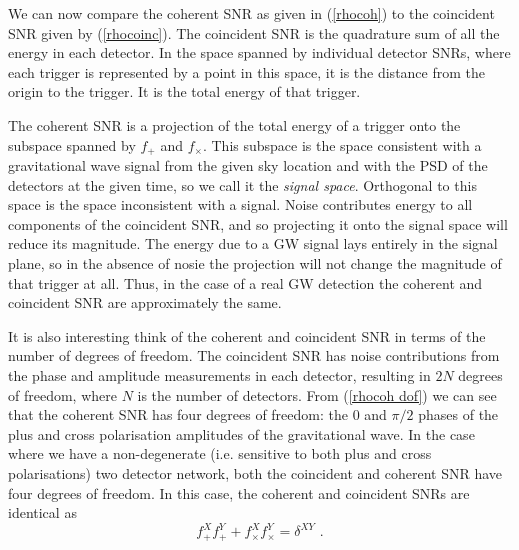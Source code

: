\documentclass[11pt]{cuthesis}
\newcommand{\fs}{\text{ .}}
\begin{document}
We can now compare the coherent SNR as given in (\ref{rhocoh}) to the coincident SNR given by (\ref{rhocoinc}). The coincident SNR is the quadrature sum of all the energy in each detector. In the space spanned by individual detector SNRs, where each trigger is represented by a point in this space, it is the distance from the origin to the trigger. It is the total energy of that trigger. 

The coherent SNR is a projection of the total energy of a trigger onto the subspace spanned by $f_+$ and $f_\times$. This subspace is the space consistent with a gravitational wave signal from the given sky location and with the PSD of the detectors at the given time, so we call it the \textit{signal space}. Orthogonal to this space is the space inconsistent with a signal. Noise contributes energy to all components of the coincident SNR, and so projecting it onto the signal space will reduce its magnitude. The energy due to a GW signal lays entirely in the signal plane, so in the absence of nosie the projection will not change the magnitude of that trigger at all. Thus, in the case of a real GW detection the coherent and coincident SNR are approximately the same.

It is also interesting think of the coherent and coincident SNR in terms of the number of degrees of freedom. The coincident SNR has noise contributions from the phase and amplitude measurements in each detector, resulting in $2N$ degrees of freedom, where $N$ is the number of detectors. From (\ref{rhocoh dof}) we can see that the coherent SNR has four degrees of freedom: the $0$ and $\pi/2$ phases of the plus and cross polarisation amplitudes of the gravitational wave. In the case where we have a non-degenerate (i.e. sensitive to both plus and cross polarisations) two detector network, both the coincident and coherent SNR have four degrees of freedom. In this case, the coherent and coincident SNRs are identical as
\begin{equation}
f^X_{+}f^Y_{+}+f^X_{\times}f^Y_{\times}=\delta^{XY} \fs
\end{equation}
\end{document}
